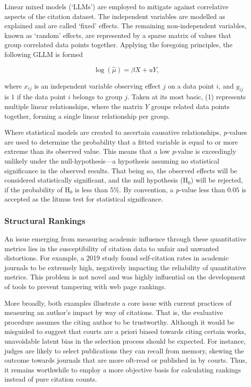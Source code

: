 Linear mixed models (`LLMs') are employed to mitigate against correlative aspects of the citation dataset. The independent variables are modelled as explained and are called `fixed' effects. The remaining non-independent variables, known as `random' effects, are represented by a sparse matrix of values that group correlated data points together. Applying the foregoing principles, the following GLLM is formed 

\begin{equation}
\log(\hat{\mu}) = \beta X + u Y,
\end{equation}

where $x_{ij}$ is an independent variable observing effect $j$ on a data point $i$, and $y_{ij}$ is $1$ if the data point $i$ belongs to group $j$. Taken at its most basic, (1) represents multiple linear relationships, where the matrix $Y$ groups related data points together, forming a single linear relationship per group.

Where statistical models are created to ascertain causative relationships, \textit{p}-values are used to determine the probability that a fitted variable is equal to or more extreme than its observed value. This means that a low \textit{p}-value is exceedingly unlikely under the null-hypothesis---a hypothesis assuming no statistical significance in the observed results. That being so, the observed effects will be considered statistically significant, and the null hypothesis ($\mathrm{H}_0$) will be rejected, if the probability of $\mathrm{H}_0$ is less than 5\%. By convention, a \textit{p}-value less than $0.05$ is accepted as the litmus test for statistical significance.

\subsubsection{Structural Rankings}
An issue emerging from measuring academic influence through these quantitative metrics lies in the susceptibility of citation data to unfair and unwanted distortions. For example, a 2019 study found self-citation rates in academic journals to be extremely high, negatively impacting the reliability of quantitative metrics. This problem is not novel and was highly influential on the development of tools to prevent tampering with web page rankings. 

More broadly, both examples illustrate a core issue with current practices of measuring an author's impact by way of citations. That is, the evaluative procedure assumes the citing author to be trustworthy. Although it would be misguided to suggest that courts are a priori biased towards citing certain works, unavoidable latent bias in the selection process should be expected. For instance, judges are likely to select publications they can recall from memory, skewing the outcome towards journals that are more oft-read or published in by courts. Thus, it remains worthwhile to employ a more objective basis for calculating rankings instead of pure citation counts.


